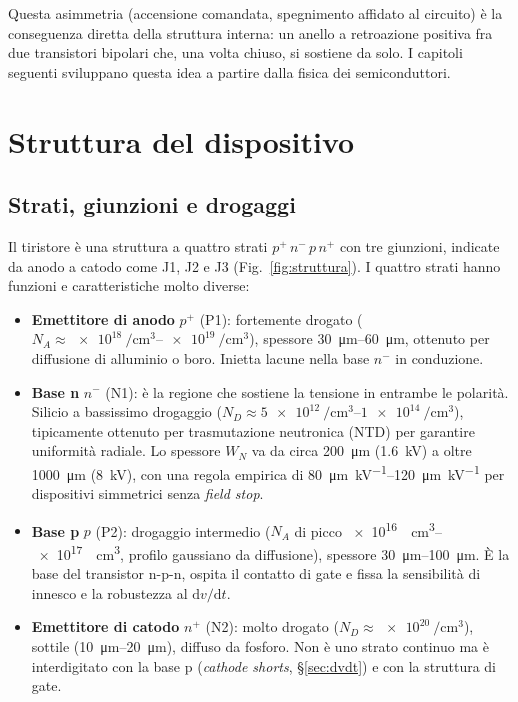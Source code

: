 \documentclass[11pt,a4paper]{article}
\newcommand{\dvdt}{\ensuremath{\mathrm{d}v/\mathrm{d}t}}
\newcommand{\en}[1]{\emph{#1}}   %
\begin{document}
Questa asimmetria (accensione comandata, spegnimento affidato al circuito) è la conseguenza diretta della struttura interna: un anello a retroazione positiva fra due transistori bipolari che, una volta chiuso, si sostiene da solo. I capitoli seguenti sviluppano questa idea a partire dalla fisica dei semiconduttori.

\section{Struttura del dispositivo}
\subsection{Strati, giunzioni e drogaggi}
Il tiristore è una struttura a quattro strati $p^+\,n^-\,p\,n^+$ con tre giunzioni, indicate da anodo a catodo come J1, J2 e J3 (Fig.~\ref{fig:struttura}). I quattro strati hanno funzioni e caratteristiche molto diverse:
\begin{itemize}
  \item \textbf{Emettitore di anodo} $p^+$ (P1): fortemente drogato ($N_A \approx \qtyrange{e18}{e19}{\per\cm\cubed}$), spessore \qtyrange{30}{60}{\um}, ottenuto per diffusione di alluminio o boro. Inietta lacune nella base $n^-$ in conduzione.
  \item \textbf{Base n} $n^-$ (N1): è la regione che sostiene la tensione in entrambe le polarità. Silicio a bassissimo drogaggio ($N_D \approx \qtyrange{5e12}{1e14}{\per\cm\cubed}$), tipicamente ottenuto per trasmutazione neutronica (NTD) per garantire uniformità radiale. Lo spessore $W_N$ va da circa \qty{200}{\um} (\qty{1.6}{\kV}) a oltre \qty{1000}{\um} (\qty{8}{\kV}), con una regola empirica di \qtyrange{80}{120}{\um\per\kV} per dispositivi simmetrici senza \en{field stop}.
  \item \textbf{Base p} $p$ (P2): drogaggio intermedio ($N_A$ di picco \qtyrange{e16}{e17}{\per\cm\cubed}, profilo gaussiano da diffusione), spessore \qtyrange{30}{100}{\um}. È la base del transistor n-p-n, ospita il contatto di gate e fissa la sensibilità di innesco e la robustezza al $\dvdt$.
  \item \textbf{Emettitore di catodo} $n^+$ (N2): molto drogato ($N_D \approx \qty{e20}{\per\cm\cubed}$), sottile (\qtyrange{10}{20}{\um}), diffuso da fosforo. Non è uno strato continuo ma è interdigitato con la base p (\en{cathode shorts}, \S\ref{sec:dvdt}) e con la struttura di gate.
\end{itemize}
\end{document}
